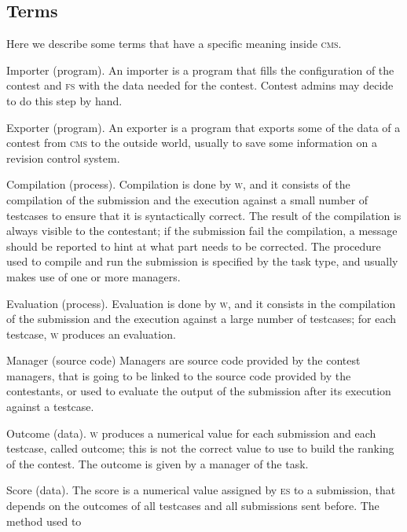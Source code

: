 \documentclass[a4paper,8pt]{amsart}
\newcommand{\CMS}{\textsc{cms}}
\newcommand{\FS}{\textsc{fs}}
\newcommand{\ES}{\textsc{es}}
\newcommand{\WS}{\textsc{w}}
\newenvironment{squishlist}{%
  \begin{list}{\textbullet}%
    { \setlength{\itemsep}{0pt}%
      \setlength{\parsep}{3pt}%
      \setlength{\topsep}{3pt}%
      \setlength{\partopsep}{0pt}%
      \setlength{\leftmargin}{1.5em}%
      \setlength{\labelwidth}{1em}%
      \setlength{\labelsep}{0.5em} }%
}{\end{list}}
\begin{document}
\begin{multicols}{2}

  \section{Terms}

  Here we describe some terms that have a specific meaning inside
  \CMS{}.

  \begin{squishlist}
  \item[Importer (program).] An importer is a program that fills the
    configuration of the contest and \FS{} with the data needed for
    the contest. Contest admins may decide to do this step by hand.
  \item[Exporter (program).] An exporter is a program that exports
    some of the data of a contest from \CMS{} to the outside world,
    usually to save some information on a revision control system.
  \item[Compilation (process).] Compilation is done by \WS{}, and it
    consists of the compilation of the submission and the execution
    against a small number of testcases to ensure that it is
    syntactically correct. The result of the compilation is always
    visible to the contestant; if the submission fail the compilation,
    a message should be reported to hint at what part needs to be
    corrected. The procedure used to compile and run the submission is
    specified by the task type, and usually makes use of one or more
    managers.
  \item[Evaluation (process).] Evaluation is done by \WS{}, and it
    consists in the compilation of the submission and the execution
    against a large number of testcases; for each testcase, \WS{}
    produces an evaluation.
  \item[Manager (source code)] Managers are source code provided by
    the contest managers, that is going to be linked to the source
    code provided by the contestants, or used to evaluate the output
    of the submission after its execution against a testcase.
  \item[Outcome (data).] \WS{} produces a numerical value for each
    submission and each testcase, called outcome; this is not the
    correct value to use to build the ranking of the contest. The
    outcome is given by a manager of the task.
  \item[Score (data).] The score is a numerical value assigned by
    \ES{} to a submission, that depends on the outcomes of all
    testcases and all submissions sent before. The method used to

\end{squishlist}
\end{multicols}
\end{document}
